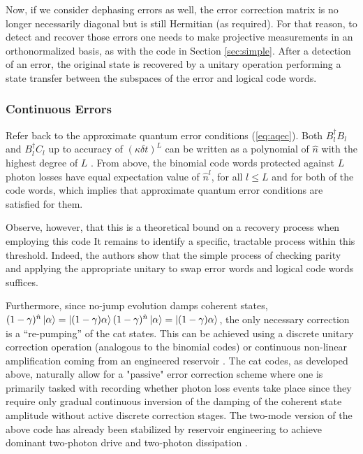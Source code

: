 \documentclass[12]{amsart}
\newcommand\0{\mathbf{0}}
\newcommand\<{\langle}
\renewcommand\>{\rangle}
\begin{document}
Now, if we consider dephasing errors as well, the error correction matrix is no longer necessarily diagonal but is still Hermitian (as required). For that reason, to detect and recover those errors one needs to make projective measurements in an orthonormalized basis, as with the code in Section \ref{sec:simple}. After a detection of an error, the original state is recovered by a unitary operation performing a state transfer between the subspaces of the error and logical code words.

\subsubsection{Continuous Errors}
\label{sec:cat-cont}

Refer back to the approximate quantum error conditions (\ref{eq:aqec}). Both $B_l^\dag B_l$ and $B_l^\dag C_l$ up to accuracy of $(\kappa \delta t)^L$ can be written as a polynomial of $\hat{n}$ with the highest degree of $L$ \cite{michael2016new}. From above, the binomial code words protected against $L$ photon losses have equal expectation value of $\hat{n}^l$, for all $l \leq L$ and for both of the code words, which implies that approximate quantum error conditions are satisfied for them.

Observe, however, that this is a theoretical bound on a recovery process when employing this code It remains to identify a specific, tractable process within this threshold. Indeed, the authors show that the simple process of checking parity and applying the appropriate unitary to swap error words and logical code words suffices.

Furthermore, since no-jump evolution damps coherent states, $(1 - \gamma)^{\hat{n}}\ket{\alpha} = \ket{(1 - \gamma) \alpha}(1 - \gamma)^{\hat{n}}\ket{\alpha} = \ket{(1 - \gamma) \alpha}$, the only necessary correction is a “re-pumping” of the cat states. This can be achieved using a discrete unitary correction operation (analogous to the binomial codes) or continuous non-linear amplification coming from an engineered reservoir \cite{leghtas2013hardware, mirrahimi2014dynamically}. The cat codes, as developed above, naturally allow for a "passive" error correction scheme where one is primarily tasked with recording whether photon loss events take place since they require only gradual continuous inversion of the damping of the coherent state amplitude without active discrete correction stages. The two-mode version of the above code has already been stabilized by reservoir engineering to achieve dominant two-photon drive and two-photon dissipation \cite{leghtas2015confining}.
\end{document}
